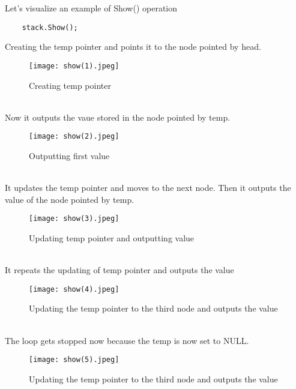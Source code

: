 \documentclass[11pt,fleqn]{book} %
\begin{document}
Let's visualize an example of Show() operation
\begin{example}
	\begin{lstlisting}
	stack.Show();
	\end{lstlisting}
Creating the temp pointer and points it to the node pointed by head.
\begin{figure}[H]
	\centering
	\texttt{[image: show(1).jpeg]}
	\caption{Creating temp pointer}
\end{figure} ~\\
Now it outputs the vaue stored in the node pointed by temp.
\begin{figure}[H]
	\centering
	\texttt{[image: show(2).jpeg]}
	\caption{Outputting first value}
\end{figure} ~\\
It updates the temp pointer and moves to the next node. Then it outputs the value of the node pointed by temp.
\begin{figure}[H]
	\centering
	\texttt{[image: show(3).jpeg]}
	\caption{Updating temp pointer and outputting value}
\end{figure} ~\\
It repeats the updating of temp pointer and outputs the value
\begin{figure}[H]
	\centering
	\texttt{[image: show(4).jpeg]}
	\caption{Updating the temp pointer to the third node and outputs the value}
\end{figure} ~\\
The loop gets stopped now because the temp is now set to NULL.
\begin{figure}[H]
	\centering
	\texttt{[image: show(5).jpeg]}
	\caption{Updating the temp pointer to the third node and outputs the value}
\end{figure}
\end{example}
\newpage
\end{document}
